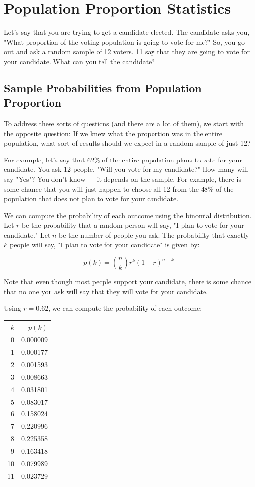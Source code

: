 \chapter{Population Proportion Statistics}

Let's say that you are trying to get a candidate elected. The candidate asks you, "What proportion of the voting population is going to vote for me?" 
So, you go out and ask a random sample of 12 voters. 11 say that they are going to vote for your candidate. What can you tell the candidate?

\section{Sample Probabilities from Population Proportion}

To address these sorts of questions (and there are a lot of them), we start with the opposite question: If we knew what the proportion was in the 
entire population, what sort of results should we expect in a random sample of just 12?

For example, let's say that 62\% of the entire population plans to vote for your candidate. You ask 12 people, "Will you vote for my candidate?" How many will say "Yes"? You don't know --- it depends
on the sample. For example, there is some chance that you will just happen to choose all 12 from the 48\% of the population that does not plan to vote for your candidate.

We can compute the probability of each outcome using the binomial distribution. Let $r$ be the probability that a random person will say, "I plan to vote for your candidate." Let $n$ be the number of people 
you ask. The probability that exactly $k$ people will say, "I plan to vote for your candidate" is given by:

$$p(k) = \binom{n}{k}r^k(1-r)^{n-k}$$

Note that even though most people support your candidate, there is some chance that no one you ask will say that they will vote for your candidate. 

Using $r=0.62$, we can compute the probability of each outcome:


\begin{tabular}{r | r}
$k$ & $p(k)$ \\
\hline
0 & 0.000009 \\
1 & 0.000177 \\
2 & 0.001593 \\
3 & 0.008663 \\
4 & 0.031801 \\
5 & 0.083017 \\
6 & 0.158024 \\
7 & 0.220996 \\
8 & 0.225358 \\
9 & 0.163418 \\
10 & 0.079989 \\
11 & 0.023729 
\end{tabular}

